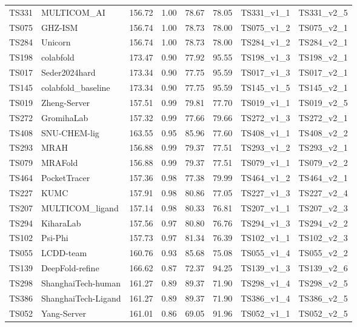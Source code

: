 \begin{longtable}{llllllll}
TS331 & MULTICOM\_AI & 156.72 & 1.00 & 78.67 & 78.05 & TS331\_v1\_1 & TS331\_v2\_5 \\ 
TS075 & GHZ-ISM & 156.74 & 1.00 & 78.73 & 78.00 & TS075\_v1\_2 & TS075\_v2\_1 \\ 
TS284 & Unicorn & 156.74 & 1.00 & 78.73 & 78.00 & TS284\_v1\_2 & TS284\_v2\_1 \\ 
TS198 & colabfold & 173.47 & 0.90 & 77.92 & 95.55 & TS198\_v1\_3 & TS198\_v2\_1 \\ 
TS017 & Seder2024hard & 173.34 & 0.90 & 77.75 & 95.59 & TS017\_v1\_3 & TS017\_v2\_1 \\ 
TS145 & colabfold\_baseline & 173.34 & 0.90 & 77.75 & 95.59 & TS145\_v1\_5 & TS145\_v2\_1 \\ 
TS019 & Zheng-Server & 157.51 & 0.99 & 79.81 & 77.70 & TS019\_v1\_1 & TS019\_v2\_5 \\ 
TS272 & GromihaLab & 157.32 & 0.99 & 77.66 & 79.66 & TS272\_v1\_3 & TS272\_v2\_1 \\ 
TS408 & SNU-CHEM-lig & 163.55 & 0.95 & 85.96 & 77.60 & TS408\_v1\_1 & TS408\_v2\_2 \\ 
TS293 & MRAH & 156.88 & 0.99 & 79.37 & 77.51 & TS293\_v1\_2 & TS293\_v2\_1 \\ 
TS079 & MRAFold & 156.88 & 0.99 & 79.37 & 77.51 & TS079\_v1\_1 & TS079\_v2\_2 \\ 
TS464 & PocketTracer & 157.36 & 0.98 & 77.38 & 79.99 & TS464\_v1\_2 & TS464\_v2\_1 \\ 
TS227 & KUMC & 157.91 & 0.98 & 80.86 & 77.05 & TS227\_v1\_3 & TS227\_v2\_4 \\ 
TS207 & MULTICOM\_ligand & 157.14 & 0.98 & 80.33 & 76.81 & TS207\_v1\_1 & TS207\_v2\_3 \\ 
TS294 & KiharaLab & 157.56 & 0.97 & 80.80 & 76.76 & TS294\_v1\_3 & TS294\_v2\_2 \\ 
TS102 & Psi-Phi & 157.73 & 0.97 & 81.34 & 76.39 & TS102\_v1\_1 & TS102\_v2\_3 \\ 
TS055 & LCDD-team & 160.76 & 0.93 & 85.68 & 75.08 & TS055\_v1\_4 & TS055\_v2\_2 \\ 
TS139 & DeepFold-refine & 166.62 & 0.87 & 72.37 & 94.25 & TS139\_v1\_3 & TS139\_v2\_6 \\ 
TS298 & ShanghaiTech-human & 161.27 & 0.89 & 89.37 & 71.90 & TS298\_v1\_4 & TS298\_v2\_5 \\ 
TS386 & ShanghaiTech-Ligand & 161.27 & 0.89 & 89.37 & 71.90 & TS386\_v1\_4 & TS386\_v2\_5 \\ 
TS052 & Yang-Server & 161.01 & 0.86 & 69.05 & 91.96 & TS052\_v1\_1 & TS052\_v2\_5 \\ 

\end{longtable}
